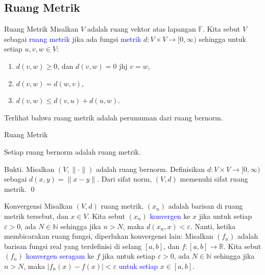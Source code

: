 \documentclass[xcolor={dvipsnames}, 9pt]{beamer}
\renewcommand{\emph}[1]{\textcolor{Blue}{#1}}
\begin{document}
    \subsection{Ruang Metrik}
	\begin{frame}{Ruang Metrik}
		Misalkan $V$ adalah ruang vektor atas lapangan $\mathbb{F}$. Kita sebut $V$ sebagai \emph{ruang metrik} jika ada fungsi \emph{metrik} $d:V\times V\to [0,\infty)$ sehingga untuk setiap $u,v,w\in V$:
		\begin{enumerate}
			\item $d(v,w) \geq 0$, dan $d(v,w) = 0$ jhj $v=w$,
			\item $d(v,w) = d(w,v)$,
			\item $d(v,w) \leq d(v,u) + d(u,w)$.
		\end{enumerate}
        Terlihat bahwa ruang metrik adalah perumuman dari ruang bernorm.
	\end{frame}
    \begin{frame}{Ruang Metrik}
        \begin{lemma}
        	Setiap ruang bernorm adalah ruang metrik.
        \end{lemma}
        Bukti. Misalkan $(V,\|\cdot\|)$ adalah ruang bernorm. Definisikan $d:V\times V\to [0,\infty)$ sebagai $d(x,y) = \|x-y\|$. Dari sifat norm, $(V,d)$ memenuhi sifat ruang metrik. \qed \newline
    \end{frame}
    \begin{frame}{Konvergensi}
        Misalkan $(V,d)$ ruang metrik, $(x_n)$ adalah barisan di ruang metrik tersebut, dan $x\in V$. Kita sebut $(x_n)$ \emph{konvergen} ke $x$ jika untuk setiap $\varepsilon>0$, ada $N\in\mathbb{N}$ sehingga jika $n>N$, maka $d(x_n,x)<\varepsilon$. \newline
        Nanti, ketika membicarakan ruang fungsi, diperlukan konvergensi lain:\newline
        Misalkan $(f_n)$ adalah barisan fungsi real yang terdefinisi di selang $[a,b]$, dan $f:[a,b]\to\mathbb{R}$. Kita sebut $(f_n)$ \emph{konvergen seragam} ke $f$ jika untuk setiap $\varepsilon>0$, ada $N\in\mathbb{N}$ sehingga jika $n>N$, maka $|f_n(x)-f(x)|<\varepsilon$ \emph{untuk setiap} $x\in[a,b]$.
    \end{frame}
\end{document}

